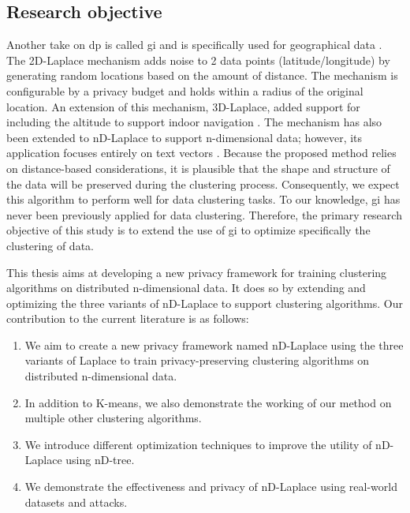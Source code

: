 \subsection*{Research objective}
Another take on \gls{dp} is called \gls{gi} and is specifically used for geographical data  \citep{DBLP:journals/corr/abs-1212-1984}.
The 2D-Laplace mechanism adds noise to 2 data points (latitude/longitude) by generating random locations based on the amount of distance.
The mechanism is configurable by a privacy budget and holds within a radius of the original location.
An extension of this mechanism, 3D-Laplace, added support for including the altitude to support indoor navigation \citep{9646489}.
The mechanism has also been extended to nD-Laplace to support n-dimensional data; however, its application focuses entirely on text vectors \citep{fernandes_generalised_2019}. \newline
Because the proposed method relies on distance-based considerations, it is plausible that the shape and structure of the data will be preserved during the clustering process.
Consequently, we expect this algorithm to perform well for data clustering tasks.
To our knowledge, \gls{gi} has never been previously applied for data clustering.
Therefore, the primary research objective of this study is to extend the use of \gls{gi} to optimize specifically the clustering of data. \newline

This thesis aims at developing a new privacy framework for training clustering algorithms on distributed n-dimensional data.
It does so by extending and optimizing the three variants of nD-Laplace to support clustering algorithms.
Our contribution to the current literature is as follows:
\begin{enumerate}
  \item We aim to create a new privacy framework named nD-Laplace using the three variants of Laplace to train privacy-preserving clustering algorithms on distributed n-dimensional data.
  \item In addition to K-means, we also demonstrate the working of our method on multiple other clustering algorithms.
  \item We introduce different optimization techniques to improve the utility of nD-Laplace using nD-tree.
  \item We demonstrate the effectiveness and privacy of nD-Laplace using real-world datasets and attacks.
\end{enumerate}

